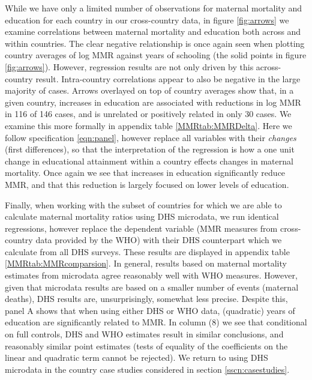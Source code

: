 \documentclass{article}[12pt,subeqn]
\begin{document}
\begin{spacing}{1.4}
While we have only a limited number of observations for maternal
mortality and education for each country in our cross-country data, in figure
\ref{fig:arrows} we examine correlations between maternal mortality and 
education both across and within countries.  The clear negative relationship
is once again seen when plotting country averages of log MMR against years of
schooling (the solid points in figure \ref{fig:arrows}).  However, regression
results are not only driven by this across-country result.  Intra-country
correlations appear to also be negative in the large majority of cases. Arrows
overlayed on top of country averages show that, in a given country, increases
in education are associated with reductions in log MMR in 116 of 146 cases,
and is unrelated or positively related in only 30 cases.  We examine this
more formally in appendix table \ref{MMRtab:MMRDelta}.  Here we follow
specification \ref{eqn:panel}, however replace all variables with their
\emph{changes} (first differences), so that the interpretation of the regression
is how a one unit change in educational attainment within a country effects
changes in maternal mortality.  Once again we see that increases in education
significantly reduce MMR, and that this reduction is largely focused on
lower levels of education.

Finally, when working with the subset of countries for which we are able to
calculate maternal mortality ratios using DHS microdata, we run identical
regressions, however replace the dependent variable (MMR measures from cross-%
country data provided by the WHO) with their DHS counterpart which we 
calculate from all DHS surveys.  These results are displayed in appendix table 
\ref{MMRtab:MMRcomparsion}.  In general, results based on maternal mortality
estimates from microdata agree reasonably well with WHO measures.  However,
given that microdata results are based on a smaller number of events (maternal
deaths), DHS results are, unsurprisingly, somewhat less precise.  Despite this, 
panel A shows that when using either DHS or WHO data, (quadratic) years of 
education are 
significantly related to MMR.  In column (8) we see that conditional on full
controls, DHS and WHO estimates result in similar conclusions, and reasonably
similar point estimates (tests of equality of the coefficients on the linear
and quadratic term cannot be rejected).  We return to using DHS microdata
in the country case studies considered in section \ref{sscn:casestudies}.


\end{spacing}
\end{document}
